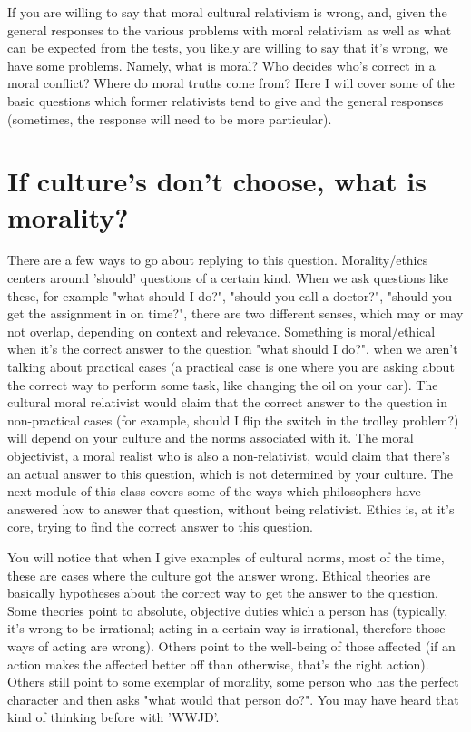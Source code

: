 If you are willing to say that moral cultural relativism is wrong, and, given the general responses to the various problems with moral relativism as well as what can be expected from the tests, you likely are willing to say that it's wrong, we have some problems. Namely, what is moral? Who decides who's correct in a moral conflict? Where do moral truths come from? Here I will cover some of the basic questions which former relativists tend to give and the general responses (sometimes, the response will need to be more particular).

\section{If culture's don't choose, what is morality?}

There are a few ways to go about replying to this question. Morality/ethics centers around 'should' questions of a certain kind. When we ask questions like these, for example "what should I do?", "should you call a doctor?", "should you get the assignment in on time?",  there are two different senses, which may or may not overlap, depending on context and relevance. Something is moral/ethical when it's the correct answer to the question "what should I do?", when we aren't talking about practical cases (a practical case is one where you are asking about the correct way to perform some task, like changing the oil on your car). The cultural moral relativist would claim that the correct answer to the question in non-practical cases (for example, should I flip the switch in the trolley problem?) will depend on your culture and the norms associated with it. The moral objectivist, a moral realist who is also a non-relativist, would claim that there's an actual answer to this question, which is not determined by your culture. The next module of this class covers some of the ways which philosophers have answered how to answer that question, without being relativist. Ethics is, at it's core, trying to find the correct answer to this question.

You will notice that when I give examples of cultural norms, most of the time, these are cases where the culture got the answer wrong. Ethical theories are basically hypotheses about the correct way to get the answer to the question. Some theories point to absolute, objective duties which a person has (typically, it's wrong to be irrational; acting in a certain way is irrational, therefore those ways of acting are wrong). Others point to the well-being of those affected (if an action makes the affected better off than otherwise, that's the right action). Others still point to some exemplar of morality, some person who has the perfect character and then asks "what would that person do?". You may have heard that kind of thinking before with 'WWJD'.  

